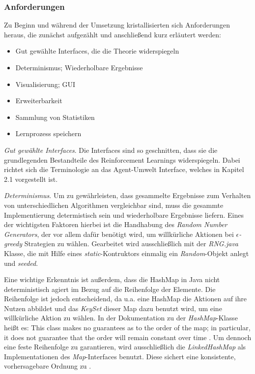 

\subsubsection{Anforderungen}
Zu Beginn und während der Umsetzung kristallisierten sich Anforderungen heraus, die zunächst aufgezählt und anschließend kurz erläutert werden:

\begin{itemize}
    \item Gut gewählte Interfaces, die die Theorie widerspiegeln
    \item Determinismus; Wiederholbare Ergebnisse
    \item Visualisierung; GUI
    \item Erweiterbarkeit
    \item Sammlung von Statistiken
    \item Lernprozess speichern
\end{itemize}

\textit{Gut gewählte Interfaces}. Die Interfaces sind so geschnitten, dass sie die grundlegenden Bestandteile des Reinforcement Learnings widerspiegeln. Dabei richtet sich die Terminologie an das Agent-Umwelt Interface, welches in Kapitel 2.1 vorgestellt ist. 
\par 
\textit{Determinismus}. Um zu gewährleisten, dass gesammelte Ergebnisse zum Verhalten von unterschiedlichen Algorithmen vergleichbar sind, muss die gesammte Implementierung determistisch sein und wiederholbare Ergebnisse liefern. Eines der wichtigsten Faktoren hierbei ist die Handhabung des \textit{Random Number Generators}, der vor allem dafür benötigt wird, um \glqq willkürliche\grqq{} Aktionen bei $\epsilon$\textit{-greedy} Strategien zu wählen. Gearbeitet wird ausschließlich mit der \textit{RNG.java} Klasse, die mit Hilfe eines \textit{static}-Kontruktors einmalig ein \textit{Random}-Objekt anlegt und \textit{seeded}.
\par 
Eine wichtige Erkenntnis ist außerdem, dass die HashMap in Java nicht deterministisch agiert im Bezug auf die Reihenfolge der Elemente. Die Reihenfolge ist jedoch entscheidend, da u.a. eine HashMap die Aktionen auf ihre Nutzen abbildet und das \textit{KeySet} dieser Map dazu benutzt wird, um eine willkürliche Aktion zu wählen. In der Dokumentation zu der \textit{HashMap}-Klasse heißt es: \glqq This class makes no guarantees as to the order of the map; in particular, it does not guarantee that the order will remain constant over time \grqq{} \cite{hashmap}.
Um dennoch eine feste Reihenfolge zu garantieren, wird ausschließlich die \textit{LinkedHashMap} als Implementationen des \textit{Map}-Interfaces benutzt. Diese sichert eine konsistente, vorhersagebare Ordnung zu \cite{linkedHashMap}.

